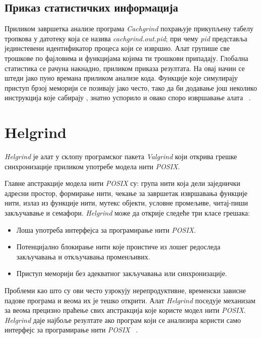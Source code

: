 \documentclass[12pt,oneside]{memoir}
\begin{document}
\subsection{Приказ статистичких информација}

\indent Приликом завршетка анализе програма \textit{Cachgrind} похрањује прикупљену табелу тропкова у датотеку која се назива \textit{cachgrind.out.pid}; при чему \textit{pid} представља јединстевени идентификатор процеса који се извршио. Алат групише све трошкове по фајловима и функцијама којима ти трошкови припадају. Глобална статистика се рачуна накнадно, приликом приказа резултата. На овај начин се штеди јако пуно времана приликом анализе кода. Функције које симулирају приступ брзој меморији се позивају јако често, тако да би додавање још неколико инструкција које сабирају , знатно успорило и овако споро извршавање алата ~\cite{cachegrindRef}.

\section{Helgrind}
\label{section_helgrind}

\indent \textit{Helgrind} је алат у склопу програмског пакета \textit{Valgrind} који открива грешке синхронизације приликом употребе модела нити \textit{POSIX}.

\indent Главне апстракције модела нити \textit{POSIX} су: група нити која дели заједнички адресни простор, формирање нити, чекање за завршетак извршавања функције нити, излаз из функције нити, мутекс објекти, условне промељиве, читај-пиши закључавање и семафори. \textit{Helgrind} може да открије следеће три класе грешака:

\begin{itemize}
  \item Лоша употреба интерфејса за програмирање нити \textit{POSIX}.
  \item Потенцијално блокирање нити које проистиче из лошег редоследа закључавања и откључавања променљивих.
  \item Приступ меморији без адекватног закључавања или синхронизације.
\end{itemize}

\indent Проблеми као што су ови често узрокују нерепродуктивне, временски зависне падове програма и веома их је тешко открити. Алат \textit{Helgrind} поседује механизам за веома прецизно праћење свих апстракција које користе модел нити \textit{POSIX}. \textit{Helgrind} даје најбоље резултате ако програм који се анализира користи само интерфејс за програмирање нити \textit{POSIX} ~\cite{helgrindRef}.
\end{document}
